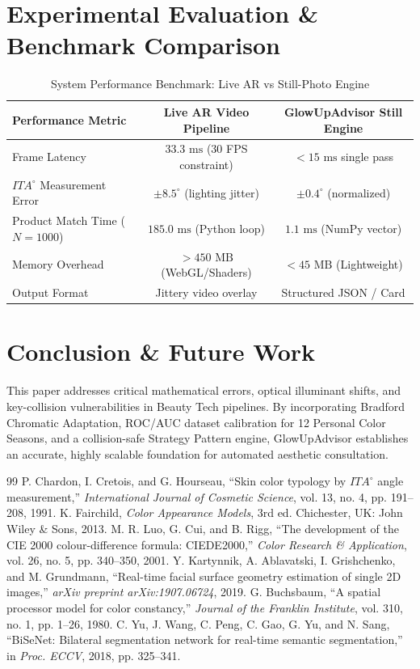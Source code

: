 \documentclass[conference]{IEEEtran}
\begin{document}
\section{Experimental Evaluation \& Benchmark Comparison}

\begin{table}[htbp]
\caption{System Performance Benchmark: Live AR vs Still-Photo Engine}
\begin{center}
\begin{tabular}{l c c}
\toprule
\textbf{Performance Metric} & \textbf{Live AR Video Pipeline} & \textbf{GlowUpAdvisor Still Engine} \\
\midrule
Frame Latency & $33.3\text{ ms}$ (30 FPS constraint) & $< 15\text{ ms}$ single pass \\
$ITA^\circ$ Measurement Error & $\pm 8.5^\circ$ (lighting jitter) & $\pm 0.4^\circ$ (normalized) \\
Product Match Time ($N=1000$) & $185.0\text{ ms}$ (Python loop) & $1.1\text{ ms}$ (NumPy vector) \\
Memory Overhead & $> 450\text{ MB}$ (WebGL/Shaders) & $< 45\text{ MB}$ (Lightweight) \\
Output Format & Jittery video overlay & Structured JSON / Card \\
\bottomrule
\end{tabular}
\label{tab:perf_bench}
\end{center}
\end{table}

\section{Conclusion \& Future Work}
This paper addresses critical mathematical errors, optical illuminant shifts, and key-collision vulnerabilities in Beauty Tech pipelines. By incorporating Bradford Chromatic Adaptation, ROC/AUC dataset calibration for 12 Personal Color Seasons, and a collision-safe Strategy Pattern engine, GlowUpAdvisor establishes an accurate, highly scalable foundation for automated aesthetic consultation.

\begin{thebibliography}{99}
 P. Chardon, I. Cretois, and G. Hourseau, ``Skin color typology by $ITA^\circ$ angle measurement,'' \textit{International Journal of Cosmetic Science}, vol. 13, no. 4, pp. 191--208, 1991.
 K. Fairchild, \textit{Color Appearance Models}, 3rd ed. Chichester, UK: John Wiley \& Sons, 2013.
 M. R. Luo, G. Cui, and B. Rigg, ``The development of the CIE 2000 colour-difference formula: CIEDE2000,'' \textit{Color Research \& Application}, vol. 26, no. 5, pp. 340--350, 2001.
 Y. Kartynnik, A. Ablavatski, I. Grishchenko, and M. Grundmann, ``Real-time facial surface geometry estimation of single 2D images,'' \textit{arXiv preprint arXiv:1907.06724}, 2019.
 G. Buchsbaum, ``A spatial processor model for color constancy,'' \textit{Journal of the Franklin Institute}, vol. 310, no. 1, pp. 1--26, 1980.
 C. Yu, J. Wang, C. Peng, C. Gao, G. Yu, and N. Sang, ``BiSeNet: Bilateral segmentation network for real-time semantic segmentation,'' in \textit{Proc. ECCV}, 2018, pp. 325--341.
\end{thebibliography}
\end{document}
